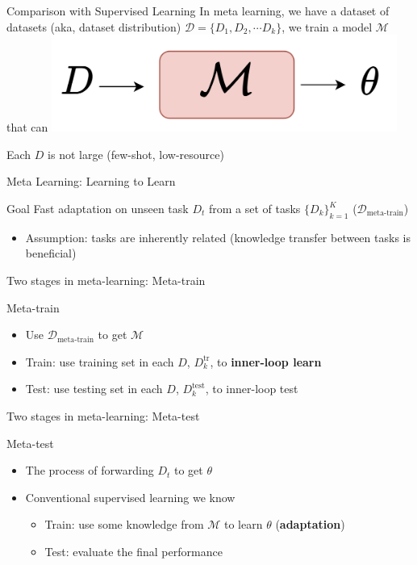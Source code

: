 \documentclass{beamer}
\begin{document}
\begin{frame}[t]{Comparison with Supervised Learning}
  In meta learning, we have a dataset of datasets (aka, dataset distribution) $\mathcal{D} = \lbrace D_1, D_2, \cdots D_k \rbrace$, we train a model $\mathcal{M}$ that can
  \center \includegraphics[width=0.85\textwidth]{fig/meta_learning.png}

  Each $D$ is not large (few-shot, low-resource)
\end{frame}

\begin{frame}[t]{Meta Learning: Learning to Learn}
  \begin{block}{Goal}
    Fast adaptation on unseen task $D_t$ from a set of tasks $\{ D_k\}^{K}_{k=1}$ ($\mathcal{D}_{\text{meta-train}}$)
  \end{block}
  \pause 

  \begin{itemize}
    \item Assumption: tasks are inherently related (knowledge transfer between tasks is beneficial)
  \end{itemize}
\end{frame}

\begin{frame}[t]{Two stages in meta-learning: Meta-train}
  \begin{block}{Meta-train}
    \begin{itemize}
      \item Use $\mathcal{D}_{\text{meta-train}}$ to get $\mathcal{M}$
      \item Train: use training set in each $D$, $D_k^{\text{tr}}$, to \textbf{inner-loop learn}
      \item Test: use testing set in each $D$, $D_k^{\text{test}}$, to inner-loop test
    \end{itemize}
  \end{block}
\end{frame}

\begin{frame}[t]{Two stages in meta-learning: Meta-test}
  \begin{block}{Meta-test}
    \begin{itemize}
      \item The process of forwarding $D_t$ to get $\theta$
      \item Conventional supervised learning we know
      \begin{itemize}
        \item Train: use some knowledge from $\mathcal{M}$ to learn $\theta$ (\textbf{adaptation})
        \item Test: evaluate the final performance
      \end{itemize}
    \end{itemize}
  \end{block}
\end{frame}
\end{document}

